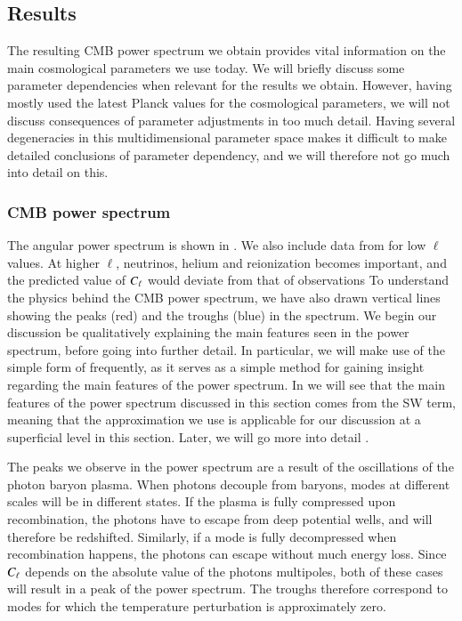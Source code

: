 \subsection{Results}\label{ssec:M4:results}
The resulting CMB power spectrum we obtain provides vital information on the main cosmological parameters we use today. We will briefly discuss some parameter dependencies when relevant for the results we obtain. However, having mostly used the latest Planck values for the cosmological parameters, we will not discuss consequences of parameter adjustments in too much detail. Having several degeneracies in this multidimensional parameter space makes it difficult to make detailed conclusions of parameter dependency, and we will therefore not go much into detail on this.  

\subsubsection{CMB power spectrum} \label{sssec:M4:results:angular_power_spectrum}
The angular power spectrum is shown in . We also include data from \cite{Planck2020} for low $\ell$ values. At higher $\ell$, neutrinos, helium and reionization becomes important, and the predicted value of $C_\ell$ would deviate from that of observations  To understand the physics behind the CMB power spectrum, we have also drawn vertical lines showing the peaks (red) and the troughs (blue) in the spectrum. We begin our discussion be qualitatively explaining the main features seen in the power spectrum, before going into further detail. In particular, we will make use of the simple form of  frequently, as it serves as a simple method for gaining insight regarding the main features of the power spectrum.  In  we will see that the main features of the power spectrum discussed in this section comes from the SW term, meaning that the approximation we use is applicable for our discussion at a superficial level in this section. Later, we will go more into detail .      

The peaks we observe in the power spectrum are a result of the oscillations of the photon baryon plasma. When photons decouple from baryons, modes at different scales will be in different states. If the plasma is fully compressed upon recombination, the photons have to escape from deep potential wells, and will therefore be redshifted. Similarly, if a mode is fully decompressed when recombination happens, the photons can escape without much energy loss. Since $C_\ell$ depends on the absolute value of the photons multipoles, both of these cases will result in a peak of the power spectrum. The troughs therefore correspond to modes for which the temperature perturbation is approximately zero.  


